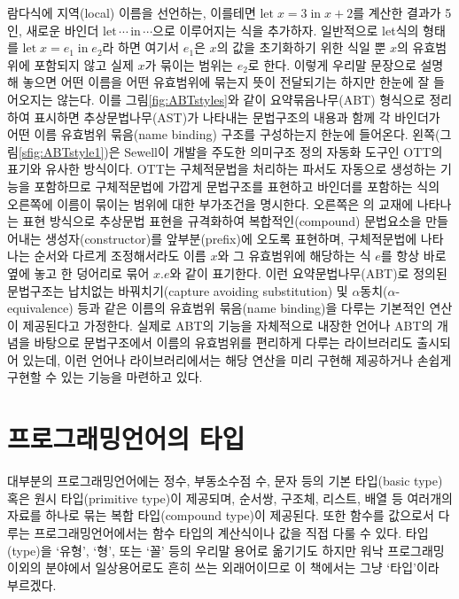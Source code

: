 람다식에 지역(local) 이름을 선언하는, 이를테면
$\textrm{let}\;x=3\;\textrm{in}\;x+2$를 계산한 결과가 5인,
새로운 바인더 $\textrm{let}\,\cdots\,\textrm{in}\,\cdots$으로
이루어지는 식을 추가하자.
일반적으로 let식의 형태를 $\textrm{let}\;x=e_1\;\textrm{in}\;e_2$라
하면 여기서 $e_1$은 $x$의 값을 초기화하기 위한 식일 뿐
$x$의 유효범위에 포함되지 않고 실제 $x$가 묶이는 범위는 $e_2$로 한다.
이렇게 우리말 문장으로 설명해 놓으면 어떤 이름을 어떤 유효범위에
묶는지 뜻이 전달되기는 하지만 한눈에 잘 들어오지는 않는다.
이를 그림\;\ref{fig:ABTstyles}와 같이 요약묶음나무(ABT) 형식으로 정리하여
표시하면 추상문법나무(AST)가 나타내는 문법구조의 내용과 함께
각 바인더가 어떤 이름 유효범위 묶음(name binding) 구조를 구성하는지
한눈에 들어온다. 왼쪽(그림\;\ref{sfig:ABTstyle1})은
Sewell\cite{Sewell2007ott}이 개발을 주도한 의미구조 정의
자동화 도구인 OTT의 표기와 유사한 방식이다.
OTT는 구체적문법을 처리하는 파서도 자동으로 생성하는 기능을
포함하므로 구체적문법에 가깝게 문법구조를 표현하고
바인더를 포함하는 식의 오른쪽에 이름이 묶이는 범위에
대한 부가조건을 명시한다. 오른쪽은 \citet{PFPL2nd}의 교재에 나타나는
표현 방식으로 추상문법 표현을 규격화하여 복합적인(compound) 문법요소을
만들어내는 생성자(constructor)를 앞부분(prefix)에 오도록 표현하며,
구체적문법에 나타나는 순서와 다르게 조정해서라도 이름 $x$와 그 유효범위에
해당하는 식 $e$를 항상 바로 옆에 놓고 한 덩어리로 묶어 $x.e$와
같이 표기한다. 이런 요약문법나무(ABT)로 정의된 문법구조는
납치없는 바꿔치기(capture avoiding substitution) 및
$\alpha$동치($\alpha$-equivalence) 등과 같은
이름의 유효범위 묶음(name binding)을 다루는 기본적인 연산이
제공된다고 가정한다. 실제로 ABT의 기능을 자체적으로 내장한
언어\cite{FreshML2003}나 ABT의 개념을 바탕으로 문법구조에서
이름의 유효범위를 편리하게 다루는 라이브러리\cite{Unbound2011}도
출시되어 있는데, 이런 언어나 라이브러리에서는 해당 연산을
미리 구현해 제공하거나 손쉽게 구현할 수 있는 기능을 마련하고 있다.

\section{프로그래밍언어의 타입}
%
%
대부분의 프로그래밍언어에는 정수, 부동소수점 수, 문자 등의
기본 타입(basic type) 혹은 원시 타입(primitive type)이 제공되며,
순서쌍, 구조체, 리스트, 배열 등 여러개의 자료를 하나로 묶는
복합 타입(compound type)이 제공된다. 또한 함수를 값으로서 다루는
프로그래밍언어에서는 함수 타입의 계산식이나 값을 직접 다룰 수 있다.
타입(type)을 `유형', `형', 또는 `꼴' 등의 우리말 용어로 옮기기도
하지만 워낙 프로그래밍 이외의 분야에서 일상용어로도 흔히 쓰는
외래어이므로 이 책에서는 그냥 `타입'이라 부르겠다.

